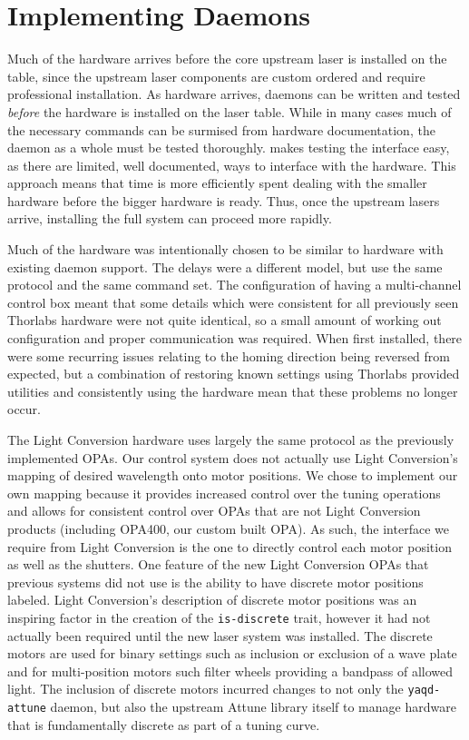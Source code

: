 \clearpage

\section{Implementing Daemons}  %

Much of the hardware arrives before the core upstream laser is installed on the table, since the upstream laser components are custom ordered and require professional installation.
As hardware arrives, \yaq{} daemons can be written and tested \textit{before} the hardware is installed on the laser table.
While in many cases much of the necessary commands can be surmised from hardware documentation, the daemon as a whole must be tested thoroughly.
\yaq{} makes testing the interface easy, as there are limited, well documented, ways to interface with the hardware.
This approach means that time is more efficiently spent dealing with the smaller hardware before the bigger hardware is ready.
Thus, once the upstream lasers arrive, installing the full system can proceed more rapidly.

Much of the hardware was intentionally chosen to be similar to hardware with existing \yaq{} daemon support.
The delays were a different model, but use the same protocol and the same command set.
The configuration of having a multi-channel control box meant that some details which were consistent for all previously seen Thorlabs hardware were not quite identical, so a small amount of working out configuration and proper communication was required.
When first installed, there were some recurring issues relating to the homing direction being reversed from expected, but a combination of restoring known settings using Thorlabs provided utilities and consistently using the hardware mean that these problems no longer occur.

The Light Conversion hardware uses largely the same protocol as the previously implemented OPAs.
Our control system does not actually use Light Conversion's mapping of desired wavelength onto motor positions.
We chose to implement our own mapping because it provides increased control over the tuning operations and allows for consistent control over OPAs that are not Light Conversion products (including OPA400, our custom built OPA).
As such, the interface we require from Light Conversion is the one to directly control each motor position as well as the shutters.
One feature of the new Light Conversion OPAs that previous systems did not use is the ability to have discrete motor positions labeled.
Light Conversion's description of discrete motor positions was an inspiring factor in the creation of the \texttt{is-discrete} \yaq{} trait, however it had not actually been required until the new laser system was installed.
The discrete motors are used for binary settings such as inclusion or exclusion of a wave plate and for multi-position motors such filter wheels providing a bandpass of allowed light.
The inclusion of discrete motors incurred changes to not only the \texttt{yaqd-attune}\cite{yaqd-attune} daemon, but also the upstream Attune library itself to manage hardware that is fundamentally discrete as part of a tuning curve.

